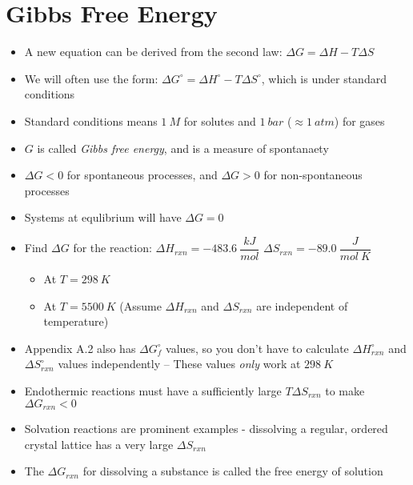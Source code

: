 \documentclass[12pt, openany, letterpaper]{memoir}
\begin{document}
\section{Gibbs Free Energy}
\begin{itemize}
	\item A new equation can be derived from the second law: $\Delta G = \Delta H - T\Delta S$
	\item We will often use the form:  $\Delta G^\circ = \Delta H^\circ - T\Delta S^\circ$, which is under standard conditions
	\item Standard conditions means $1~M$ for solutes and $1~bar$ ($\approx1~atm$) for gases
	\item $G$ is called \emph{Gibbs free energy}, and is a measure of spontanaety
	\item $\Delta G < 0$ for spontaneous processes, and $\Delta G > 0$ for non-spontaneous processes
	\item Systems at equlibrium will have $\Delta G=0$
	\item Find $\Delta G$ for the reaction:  \hspace{1em} $\Delta H_{rxn} = -483.6~\dfrac{kJ}{mol}$ \hspace{1em} $\Delta S_{rxn} = -89.0~\dfrac{J}{mol~K}$
	\begin{itemize}
		\item At $T=298~K$
		\item At $T=5500~K$ (Assume $\Delta H_{rxn}$ and $\Delta S_{rxn}$ are independent of temperature)
	\end{itemize}
	\item Appendix A.2 also has $\Delta G^{\circ}_f$ values, so you don't have to calculate $\Delta H^{\circ}_{rxn}$ and $\Delta S^{\circ}_{rxn}$ values independently -- These values \emph{only} work at $298~K$
	\item Endothermic reactions must have a sufficiently large $T\Delta S_{rxn}$ to make $\Delta G_{rxn}<0$
	\item Solvation reactions are prominent examples - dissolving a regular, ordered crystal lattice has a very large $\Delta S_{rxn}$
	\item The $\Delta G_{rxn}$ for dissolving a substance is called the free energy of solution
\end{itemize}
\end{document}
